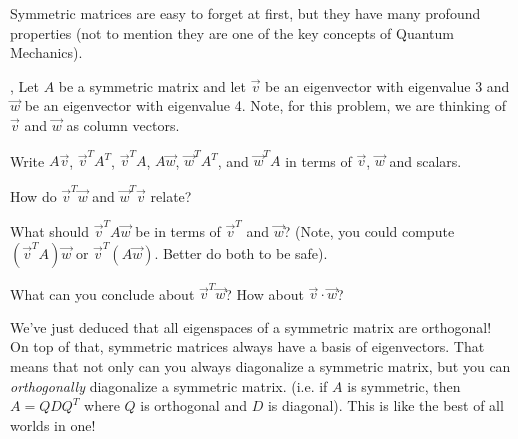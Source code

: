 \documentclass{article}
\begin{document}
	Symmetric matrices are easy to forget at first, but they have many profound 
	properties (not to mention they are one of the key concepts of Quantum Mechanics).

	\sep
	Let $A$ be a symmetric matrix and let $\vec v$ be an eigenvector with eigenvalue
	3 and $\vec w$ be an eigenvector with eigenvalue 4.  Note, for this problem,
	we are thinking of $\vec v$ and $\vec w$ as column vectors.
	\begin{Enum}
		\item Write $A\vec v$, $\vec v^TA^T$, $\vec v^TA$, $A\vec w$, $\vec w^TA^T$, 
		and $\vec w^TA$ in terms of $\vec v$, $\vec w$ and scalars.
		\item How do $\vec v^T\vec w$ and $\vec w^T\vec v$ relate?
		\item What should $\vec v^TA\vec w$ be in terms of $\vec v^T$ and
			$\vec w$? (Note, you could compute $(\vec v^TA)\vec w$
			or $\vec v^T(A\vec w)$.  Better do both to be safe).
		\item What can you conclude about $\vec v^T\vec w$?  How about
			$\vec v\cdot \vec w$?
	\end{Enum}

	We've just deduced that all eigenspaces of a symmetric matrix are orthogonal! On
	top of that, symmetric matrices always have a basis of eigenvectors.  That means
	that not only can you always diagonalize a symmetric matrix, but you can 
	\emph{orthogonally} diagonalize a symmetric matrix. (i.e. if $A$ is symmetric,
	then $A=QDQ^T$ where $Q$ is orthogonal and $D$ is diagonal).  This is like the 
	best of all worlds in one!
\end{document}
